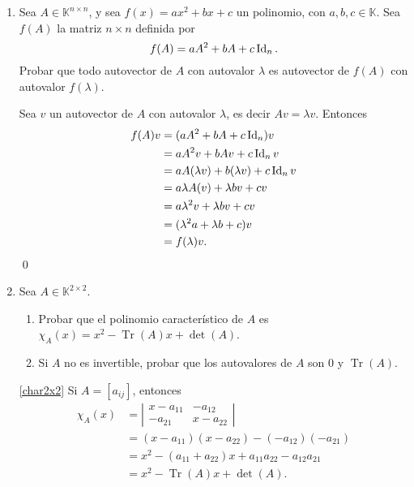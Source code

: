 \begin{enumerate}[resume,topsep=6pt,itemsep=.4cm]
    Por otro lado, $w = 2-z$ y por lo tanto $-2z+2-z=1$, es decir $-3z=-1$ $\Rightarrow$ $z = 1/3$, y  en consecuencia $w =2-z = 2- 1/3=5/3$.

    Luego, la matriz buscada es 
    $$
    A = \begin{bmatrix} 4/3 & 2/3\\1/3  & 5/3 \end{bmatrix}.
    $$

    \qed
    
    
    \item Sea $A\in\mathbb{K}^{n\times n}$, y sea $f(x) = ax^2+bx+c$ un polinomio, con $a,b,c\in\mathbb{K}$. Sea $f(A)$ la matriz $n \times n$ definida por
    $$f(A) = a A^2+bA+c\operatorname{Id}_n.$$
    Probar que todo autovector de $A$ con autovalor $\lambda$ es autovector de $f(A)$ con autovalor $f(\lambda)$.
    
    \rta Sea $v$ un autovector de $A$ con autovalor $\lambda$, es decir $Av=\lambda v$. Entonces 
    \begin{align*}
        f(A)v &= (a A^2+bA+c\operatorname{Id}_n)v \\
        &= a A^2v+bAv+c\operatorname{Id}_nv \\
        &= a A(\lambda v)+b(\lambda v)+c\operatorname{Id}_n v \\
        &=  a \lambda A(v)+\lambda bv+c v \\
        &=a \lambda^2 v+\lambda bv+c v \\
        &= (\lambda^2 a+\lambda b+c)v \\
        &= f(\lambda)v.
    \end{align*}
    \qed

        
    \item Sea $A\in\mathbb{K}^{2\times 2}$.
    
        \begin{enumerate}     
            \item\label{char2x2} Probar que el polinomio característico de $A$ es \ $\chi_A(x) = x^2-\operatorname{Tr}(A)x+\det(A)$.
            \item\label{no_inv2x2} Si $A$ no es invertible, probar que los autovalores de  $A$ son $0$ y $\operatorname{Tr}(A)$.
        \end{enumerate}
    
    \rta \ref{char2x2} Si $A= [a_{ij}]$, entonces
    \begin{align*}
        \chi_A(x) &= \left|\begin{matrix} x-a_{11} & -a_{12}\\ -a_{21} & x-a_{22} \end{matrix} \right| \\ &= (x-a_{11})(x-a_{22})-(-a_{12})(-a_{21})\\& = x^2-(a_{11}+a_{22})x+a_{11}a_{22}-a_{12}a_{21} \\
        &= x^2-\operatorname{Tr}(A)x+\det(A).
    \end{align*}


\end{enumerate}
